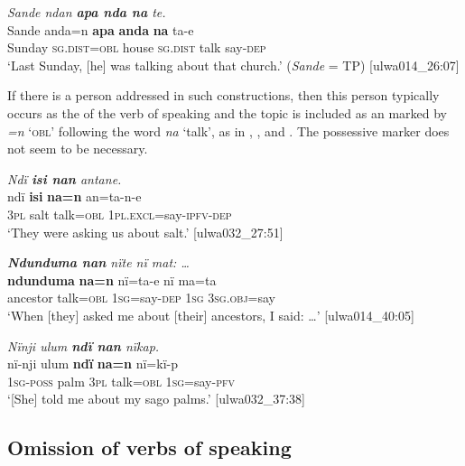 \ea%
    \label{ex:syntax:215}
          \textit{Sande ndan \textbf{apa nda na} te.}\\
\gll  Sande    anda=n    \textbf{apa}  \textbf{anda}    \textbf{na}    ta-e\\
    Sunday  \textsc{sg.dist=obl}  house  \textsc{sg.dist}  talk  say-\textsc{dep}\\
\glt `Last Sunday, [he] was talking about that church.’ (\textit{Sande} = TP) [ulwa014\_26:07]
\z

If there is a person addressed in such constructions, then this person typically occurs as the  of the verb of speaking and the topic is included as an   marked by \textit{=n} ‘\textsc{obl}’ following the word \textit{na} ‘talk’, as in , , and . The  possessive marker does not seem to be necessary.

\ea%
    \label{ex:syntax:216}
          \textit{Ndï \textbf{isi nan} antane.}\\
\gll    ndï  \textbf{isi}  \textbf{na=n}    an=ta-n-e\\
    3\textsc{pl}  salt  talk=\textsc{obl}  1\textsc{pl.excl}=say-\textsc{ipfv-dep}\\
\glt `They were asking us about salt.’ [ulwa032\_27:51]
\z

\ea%
    \label{ex:syntax:217}
          \textit{\textbf{Ndunduma nan} nïte nï mat: …}\\
\gll    \textbf{ndunduma}  \textbf{na=n}    nï=ta-e      nï    ma=ta\\
    ancestor  talk=\textsc{obl}  1\textsc{sg}=say-\textsc{dep}  \textsc{1sg}  \textsc{3sg.obj}=say\\
\glt `When [they] asked me about [their] ancestors, I said: …’ [ulwa014\_40:05]
\z

\ea%
    \label{ex:syntax:218}
          \textit{Nïnji ulum \textbf{ndï nan} nïkap.}\\
\gll    nï-nji    ulum  \textbf{ndï}  \textbf{na=n}    nï=kï-p\\
    1\textsc{sg-poss}  palm  \textsc{3pl}  talk=\textsc{obl}  1\textsc{sg}=say-\textsc{pfv}\\
\glt `[She] told me about my sago palms.’ [ulwa032\_37:38]
\z

\subsection{Omission of verbs of speaking}\label{sec:13.4.4}


